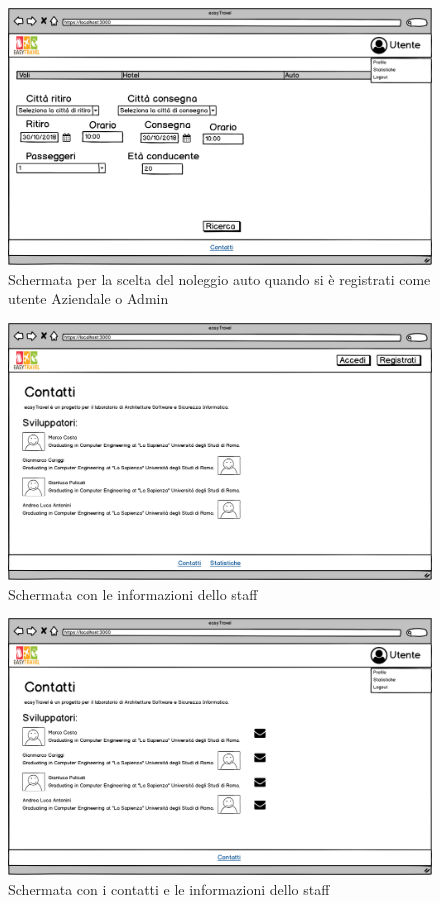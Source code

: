 \documentclass[11pt]{article}
\begin{document}
\begin{figure}[!ht]
	\includegraphics[width=1\textwidth]{./Mockup/Auto-aziendale-admin} %
	\caption{Schermata per la scelta del noleggio auto quando si è registrati come utente Aziendale o Admin}
	\label{fig:autoaziendaleadmin}
\end{figure}

\begin{figure}[!ht]
	\includegraphics[width=1\textwidth]{./Mockup/Contatti-non-registrato} %
	\caption{Schermata con le informazioni dello staff}
	\label{fig:contattinonreg}
\end{figure}

\begin{figure}[!ht]
	\includegraphics[width=1\textwidth]{./Mockup/Contatti-registrato} %
	\caption{Schermata con i contatti e le informazioni dello staff}
	\label{fig:contattireg}
\end{figure}
\end{document}
